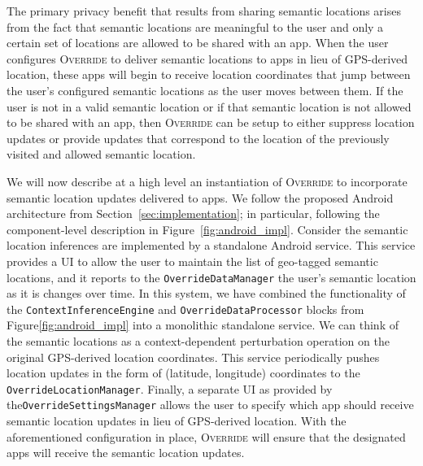 \documentclass[10pt]{sensys-proc}
\begin{document}
The primary privacy benefit that results from sharing semantic locations arises from the fact that semantic locations are meaningful to the user and only a certain set of locations are allowed to be shared with an app. When the user configures \textsc{Override} to deliver semantic locations to apps in lieu of GPS-derived location, these apps will begin to receive location coordinates that jump between the user's configured semantic locations as the user moves between them. If the user is not in a valid semantic location or if that semantic location is not allowed to be shared with an app, then \textsc{Override} can be setup to either suppress location updates or provide updates that correspond to the location of the previously visited and allowed semantic location.

We will now describe at a high level an instantiation of \textsc{Override} to incorporate semantic location updates delivered to apps. We follow the proposed Android architecture from Section~\ref{sec:implementation}; in particular, following the component-level description in Figure~\ref{fig:android_impl}. Consider the semantic location inferences are implemented by a standalone Android service. This service provides a UI to allow the user to maintain the list of geo-tagged semantic locations, and it reports to the \texttt{OverrideDataManager} the user's semantic location as it is changes over time. In this system, we have combined the functionality of the \texttt{ContextInferenceEngine} and \texttt{OverrideDataProcessor} blocks from Figure\ref{fig:android_impl} into a monolithic standalone service. We can think of the semantic locations as a context-dependent perturbation operation on the original GPS-derived location coordinates. This service periodically pushes location updates in the form of (latitude, longitude) coordinates to the \texttt{OverrideLocationManager}. Finally, a separate UI as provided by the\texttt{OverrideSettingsManager} allows the user to specify which app should receive semantic location updates in lieu of GPS-derived location. With the aforementioned configuration in place, \textsc{Override} will ensure that the designated apps will receive the semantic location updates.
\end{document}
